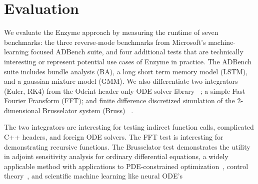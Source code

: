 \section{Evaluation}
\label{sec:eval}



We evaluate the Enzyme approach by measuring the runtime of seven benchmarks: the three reverse-mode benchmarks from Microsoft's machine-learning focused ADBench suite, and four additional tests that are technically interesting or represent potential use cases of Enzyme in practice. The ADBench suite includes bundle analysis (BA), a long short term memory model (LSTM), and a gaussian mixture model (GMM). We also differentiate two integrators (Euler, RK4) from the Odeint header-only ODE solver library ~\cite{ahnert2011odeint}; a simple Fast Fourier Fransform (FFT); and finite difference discretized simulation of the 2-dimensional Brusselator system (Bruss) ~\cite{feinberg1987chemical,yu2018mathematical}.

The two integrators are interesting for testing indirect function calls, complicated C++ headers, and foreign ODE solvers. The FFT test is interesting for demonstrating recursive functions. The Brusselator test demonstrates the utility in adjoint sensitivity analysis for ordinary differential equations, a widely applicable method with applications to PDE-constrained optimization~\cite{biegler2003large, li2004adjoint}, control theory~\cite{piasecki1997control}, and scientific machine learning like neural ODE's~\cite{rackauckas2020universal, chen2018neural}


